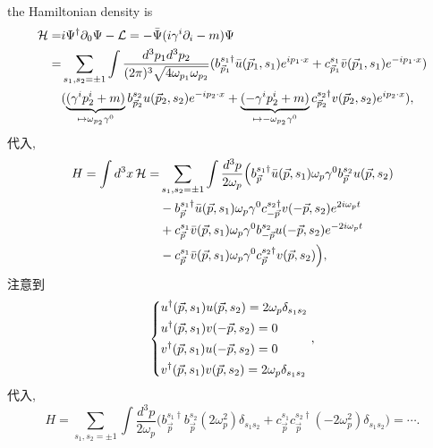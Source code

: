 \begin{itemize}
	\begin{tcolorbox}[title=calculation:]
		the Hamiltonian density is
		\begin{align}
			\mathcal{H} =& i \Psi^\dag \partial_0 \Psi - \mathcal{L} = - \bar{\Psi} (i \gamma^i \partial_i - m) \Psi \notag \\
			=& \sum_{s_1, s_2 = \pm 1} \int \frac{d^3 p_1 d^3 p_2}{(2 \pi)^3 \sqrt{4 \omega_{p_1} \omega_{p_2}}} (b^{s_1 \dag}_{\vec{p}_1} \bar{u}(\vec{p}_1, s_1) e^{i p_1 \cdot x} + c^{s_1}_{\vec{p}_1} \bar{v}(\vec{p}_1, s_1) e^{- i p_1 \cdot x}) \notag \\
			& (\underbrace{(\gamma^i p_2^i + m)}_{\mapsto \omega_{p_2} \gamma^0} b^{s_2}_{\vec{p}_2} u(\vec{p}_2, s_2) e^{- i p_2 \cdot x} + \underbrace{(- \gamma^i p_2^i + m)}_{\mapsto - \omega_{p_2} \gamma^0} c^{s_2 \dag}_{\vec{p}_2} v(\vec{p}_2, s_2) e^{i p_2 \cdot x}),
		\end{align}
		代入,
		\begin{align}
			H = \int d^3 x \, \mathcal{H} =& \sum_{s_1, s_2 = \pm 1} \int \frac{d^3 p}{2 \omega_p} \Big( b^{s_1 \dag}_{\vec{p}} \bar{u}(\vec{p}, s_1) \omega_p \gamma^0 b^{s_2}_{\vec{p}} u(\vec{p}, s_2) \notag \\
			& - b^{s_1 \dag}_{\vec{p}} \bar{u}(\vec{p}, s_1) \omega_p \gamma^0 c^{s_2 \dag}_{- \vec{p}} v(- \vec{p}, s_2) e^{2 i \omega_p t} \notag \\
			& + c^{s_1}_{\vec{p}} \bar{v}(\vec{p}, s_1) \omega_p \gamma^0 b^{s_2}_{- \vec{p}} u(- \vec{p}, s_2) e^{- 2 i \omega_p t} \notag \\
			& - c^{s_1}_{\vec{p}} \bar{v}(\vec{p}, s_1) \omega_p \gamma^0 c^{s_2 \dag}_{\vec{p}} v(\vec{p}, s_2) \Big),
		\end{align}
		注意到
		\begin{equation}
			\begin{dcases}
				u^\dag(\vec{p}, s_1) u(\vec{p}, s_2) = 2 \omega_p \delta_{s_1 s_2} \\
				u^\dag(\vec{p}, s_1) v(- \vec{p}, s_2) = 0 \\
				v^\dag(\vec{p}, s_1) u(- \vec{p}, s_2) = 0 \\
				v^\dag(\vec{p}, s_1) v(\vec{p}, s_2) = 2 \omega_p \delta_{s_1 s_2}
			\end{dcases},
		\end{equation}
		代入,
		\begin{equation}
			H = \sum_{s_1, s_2 = \pm 1} \int \frac{d^3 p}{2 \omega_p} \Big( b^{s_1 \dag}_{\vec{p}} b^{s_2}_{\vec{p}} (2 \omega_p^2) \delta_{s_1 s_2} + c^{s_1}_{\vec{p}} c^{s_2 \dag}_{\vec{p}} (- 2 \omega_p^2) \delta_{s_1 s_2} \Big) = \cdots.
		\end{equation}
	\end{tcolorbox}
\end{itemize}

